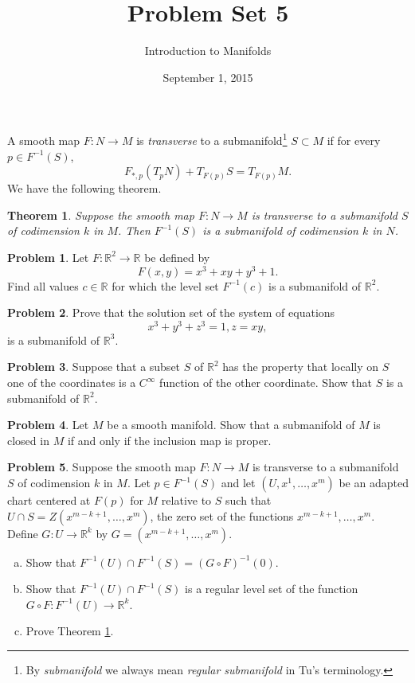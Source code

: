 \documentclass{amsart}
\newcommand{\+}[1]{\ensuremath{\mathbf{#1}}}
\newcommand{\R}{{\mathbb R}}
\newtheorem{thm}{Theorem}
\theoremstyle{definition}
\newtheorem{prob}{Problem}
\begin{document}
\title{Problem Set 5}
\date{September 1, 2015}
\author{Introduction to Manifolds}

\maketitle

A smooth map $F:N \to M$ is \emph{transverse} to a 
submanifold\footnote{By \emph{submanifold} we always mean \emph{regular submanifold} in Tu's terminology.}
$S \subset M$ if for every $p \in F^{-1}(S)$,
\[
F_{*,p}(T_pN) + T_{F(p)}S = T_{F(p)}M.
\]
We have the following theorem.


\begin{framed}
\begin{thm}\label{T:transversality}
Suppose the smooth map $F: N \to M$ is transverse to a
submanifold $S$ of codimension $k$ in $M$.  Then
$F^{-1}(S)$ is a submanifold of codimension $k$ in $N$.
\end{thm}
\end{framed}

\begin{prob}
Let $F:\R^2 \to \R$ be defined by
\[
 F(x,y) = x^3 + xy + y^3 +1.
\]
Find all values $c \in \R$ for which
the level set $F^{-1}(c)$ is a  submanifold of $\R^2$.
\end{prob}

\begin{prob}
 Prove that the solution set of the system of equations
 \[
  x^3 + y^3 + z^3 = 1, z = xy,
 \]
is a submanifold of $\R^3$.
\end{prob}


\begin{prob}
Suppose that a subset $S$ of $\R^2$ has the property that
locally on $S$ one of the coordinates is a $C^\infty$ function
of the other coordinate.  Show that $S$ is a submanifold of $\R^2$.
\end{prob} 




\begin{prob}
Let $M$ be a smooth manifold.
Show that a submanifold of $M$ is closed in $M$ if and only if
the inclusion map is proper.
\end{prob}




\begin{prob}
Suppose the smooth map $F: N \to M$ is transverse to a
submanifold $S$ of codimension $k$ in $M$.
Let $p \in F^{-1}(S)$ and let $(U,x^1,\ldots,x^m)$ be an
adapted chart centered at $F(p)$ for $M$ relative to $S$
such that $U \cap S = Z(x^{m-k+1},\ldots,x^m)$,
the zero set of the functions $x^{m-k+1},\ldots,x^m$.
Define $G:U \to \R^k$ by $G = (x^{m-k+1},\ldots,x^m)$.
\begin{enumerate}[(a)]
 \item Show that $F^{-1}(U) \cap F^{-1}(S) = (G \circ F)^{-1}(0)$.
 \item Show that $F^{-1}(U) \cap F^{-1}(S)$ is a regular level set
 of the function $G \circ F: F^{-1}(U) \to \R^k$.
 \item Prove Theorem \ref{T:transversality}.
\end{enumerate}

\end{prob}
\end{document}

